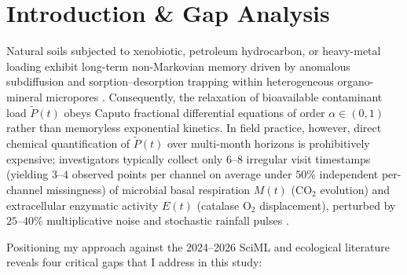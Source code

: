 \documentclass[10pt,twocolumn,a4paper]{article}
\begin{document}
\section{Introduction \& Gap Analysis}

Natural soils subjected to xenobiotic, petroleum hydrocarbon, or heavy-metal loading exhibit long-term non-Markovian memory driven by anomalous subdiffusion and sorption--desorption trapping within heterogeneous organo-mineral micropores \cite{schumer2003}. Consequently, the relaxation of bioavailable contaminant load $\tilde{P}(t)$ obeys Caputo fractional differential equations of order $\alpha \in (0, 1)$ rather than memoryless exponential kinetics. In field practice, however, direct chemical quantification of $\tilde{P}(t)$ over multi-month horizons is prohibitively expensive; investigators typically collect only $6\text{--}8$ irregular visit timestamps (yielding $3\text{--}4$ observed points per channel on average under $50\%$ independent per-channel missingness) of microbial basal respiration $M(t)$ ($\text{CO}_2$ evolution) and extracellular enzymatic activity $E(t)$ (catalase $\text{O}_2$ displacement), perturbed by $25\text{--}40\%$ multiplicative noise and stochastic rainfall pulses \cite{kolesnikov2021ag,mdpienzymes2024,mdpi2024oxidoreductases}.

Positioning my approach against the 2024--2026 SciML and ecological literature reveals four critical gaps that I address in this study:
\end{document}
